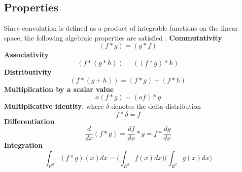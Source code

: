 \subsection{Properties}
\label{sec:convolution:mathematics:properties}
Since convolution is defined as a product of integrable functions on the linear space, the following algebraic properties are satisfied \citep{Bracewell2000}:\newline
\textbf{Commutativity}
\begin{equation}
(f * g)=(g * f)
\end{equation}
\textbf{Associativity}
\begin{equation}
(f * (g * h))=((f * g) * h)
\end{equation}
\textbf{Distributivity}
\begin{equation}
(f * (g + h))=(f * g) + (f * h)
\end{equation}
\textbf{Multiplication by a scalar value}
\begin{equation}
a (f * g) = (af) * g
\end{equation}
\textbf{Multiplicative identity}, where $\delta$ denotes the delta distribution 
\begin{equation}
f * \delta = f
\end{equation}
\textbf{Differentiation}
\begin{equation}
\frac{d}{dx}(f * g) = \frac{df}{dx} * g = f * \frac{dg}{dx}
\end{equation}
\textbf{Integration}
\begin{equation}
\int_{R^d} (f * g)(x)dx = \bigg(\int_{R^d} f(x)dx\bigg)\bigg(\int_{R^d} g(x)dx\bigg)
\end{equation}
